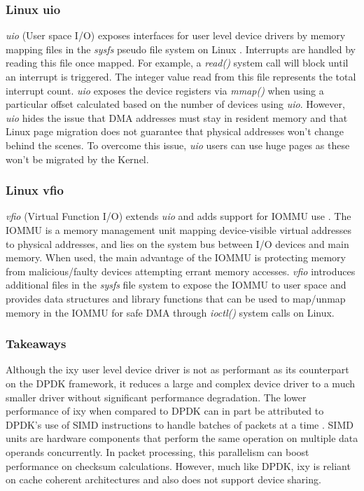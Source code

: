 \subsubsection{Linux uio}
\emph{uio} (User space I/O) exposes interfaces for user level device drivers by memory mapping files in the \emph{sysfs}
pseudo file system on Linux \cite{UIO}. Interrupts are handled by reading this file once mapped. For example,
a \emph{read()} system call will block until an interrupt is triggered. The integer value read from this file represents
the total interrupt count. \emph{uio} exposes the device registers via \emph{mmap()} when using a particular offset calculated
based on the number of devices using \emph{uio}. However, \emph{uio} hides the issue that DMA 
addresses must stay in resident memory and that Linux page migration does not guarantee that physical addresses
won't change behind the scenes. To overcome this issue, \emph{uio} users can use
huge pages as these won't be migrated by the Kernel.

\subsubsection{Linux vfio}
\emph{vfio} (Virtual Function I/O) extends \emph{uio} and adds support for IOMMU use \cite{VFIO}. The IOMMU is a memory
management unit mapping device-visible virtual addresses to physical addresses, and lies on the system bus between I/O devices
and main memory. When used, the main advantage of the IOMMU is protecting memory from malicious/faulty devices attempting
errant memory accesses. \emph{vfio} introduces additional
files in the \emph{sysfs} file system to expose the IOMMU to user space and provides data structures and library functions
that can be used to map/unmap memory in the IOMMU for safe DMA through \emph{ioctl()} system calls on Linux.

\subsubsection{Takeaways}
Although the ixy user level device driver is not as performant as its counterpart on the DPDK framework, it reduces a
large and complex device driver to a much smaller driver without significant performance degradation. The lower
performance of ixy when compared to DPDK can in part be attributed to DPDK's use of SIMD instructions to handle
batches of packets at a time \cite{Emmerich_PBHZC_19}. SIMD units are hardware components that perform the same
operation on multiple data operands concurrently. In packet processing, this parallelism can boost performance
on checksum calculations. However, much like DPDK, ixy is reliant on cache coherent architectures and also does
not support device sharing.

